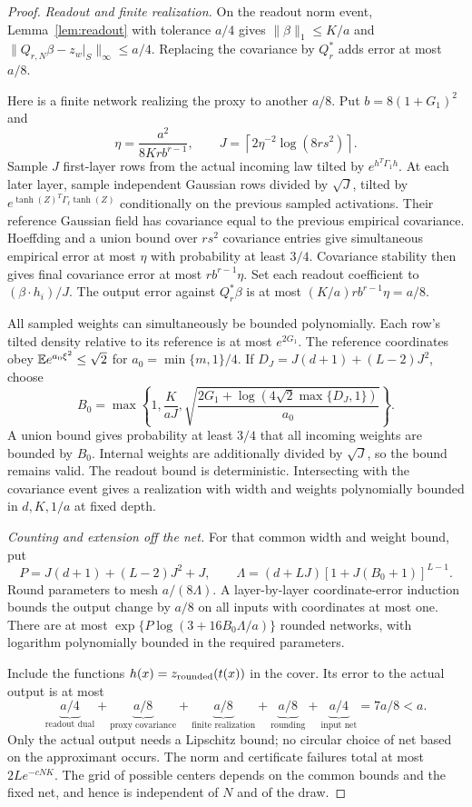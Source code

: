\begin{proof}
\emph{Readout and finite realization.}
On the readout norm event, Lemma~\ref{lem:readout} with tolerance $a/4$
gives $\|\beta\|_1\leq K/a$ and
$\|Q_{r,N}\beta-z_w|_S\|_\infty\leq a/4$.
Replacing the covariance by $Q_r^*$ adds error at most $a/8$.

Here is a finite network realizing the proxy to another $a/8$.
Put $b=8(1+G_1)^2$ and
\[
 \eta=\frac{a^2}{8Kr b^{r-1}},\qquad
 J=\left\lceil2\eta^{-2}\log(8rs^2)\right\rceil.
\]
Sample $J$ first-layer rows from the actual incoming law tilted by
$e^{h^T\Gamma_1h}$. At each later layer, sample independent Gaussian
rows divided by $\sqrt J$, tilted by
$e^{\tanh(Z)^T\Gamma_\ell\tanh(Z)}$ conditionally on the previous
sampled activations. Their reference Gaussian field has covariance equal
to the previous empirical covariance. Hoeffding and a union bound over
$rs^2$ covariance entries give simultaneous empirical error at most
$\eta$ with probability at least $3/4$.
Covariance stability then gives final covariance error at most
$r b^{r-1}\eta$. Set each readout coefficient to $(\beta\cdot h_i)/J$.
The output error against $Q_r^*\beta$ is at most
$(K/a)r b^{r-1}\eta=a/8$.

All sampled weights can simultaneously be bounded polynomially.
Each row's tilted density relative to its reference is at most $e^{2G_1}$.
The reference coordinates obey $\mathbb E e^{a_0\xi^2}\leq\sqrt2$ for
$a_0=\min\{m,1\}/4$. If $D_J=J(d+1)+(L-2)J^2$, choose
\[
 B_0=\max\left\{1,\frac K{aJ},
 \sqrt{\frac{2G_1+\log(4\sqrt2\max\{D_J,1\})}{a_0}}\right\}.
\]
A union bound gives probability at least $3/4$ that all incoming weights
are bounded by $B_0$. Internal weights are additionally divided by
$\sqrt J$, so the bound remains valid. The readout bound is deterministic.
Intersecting with the covariance event gives a realization with width and
weights polynomially bounded in $d,K,1/a$ at fixed depth.

\emph{Counting and extension off the net.}
For that common width and weight bound, put
\[
 P=J(d+1)+(L-2)J^2+J,\qquad
 \Lambda=(d+LJ)[1+J(B_0+1)]^{L-1}.
\]
Round parameters to mesh $a/(8\Lambda)$. A layer-by-layer
coordinate-error induction bounds the output change by $a/8$ on all
inputs with coordinates at most one. There are at most
$\exp\{P\log(3+16B_0\Lambda/a)\}$ rounded networks, with logarithm
polynomially bounded in the required parameters.

Include the functions $h(x)=z_{\rm rounded}(t(x))$ in the cover.
Its error to the actual output is at most
\[
 \underbrace{a/4}_{\text{readout dual}}
 +\underbrace{a/8}_{\text{proxy covariance}}
 +\underbrace{a/8}_{\text{finite realization}}
 +\underbrace{a/8}_{\text{rounding}}
 +\underbrace{a/4}_{\text{input net}}=7a/8<a.
\]
Only the actual output needs a Lipschitz bound; no circular choice of net
based on the approximant occurs. The norm and certificate failures total
at most $2Le^{-cNK}$. The grid of possible centers depends on the common
bounds and the fixed net, and hence is independent of $N$ and of the draw.
\end{proof}

